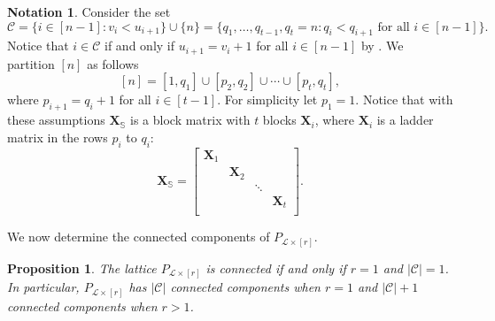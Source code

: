 \documentclass[11pt,a4paper,reqno,dvipsnames]{amsart}
\theoremstyle{plain}
\newtheorem{Proposition}[Theorem]{Proposition}
\theoremstyle{definition}
\newtheorem{Assumptions and Discussion}[Theorem]{Assumptions and Discussion}
\newtheorem{Notation}[Theorem]{Notation}
\theoremstyle{remark}
\newcommand\bfX{\mathbf{X}}
\newcommand\bfS{\mathbb{S}}
\newcommand\calC{\mathcal{C}}
\newcommand\calL{\mathcal{L}}
\newcommand{\Lr}{\ensuremath{\calL\times[r]}}
\begin{document}
\begin{Notation}\label{not: disconnected partition}
    Consider the set $$\calC=\{i\in [n-1]: v_i<u_{i+1}\} \cup \{n\}=\{q_1, \ldots, q_{t-1}, q_t=n: q_{i}<q_{i+1} \text{ for all } i\in[n-1]\}.$$ 
Notice that $i\in \calC$ if and only if $u_{i+1}=v_i+1$ for all $i\in [n-1]$ by .
    We partition $[n]$ as follows \[[n]=[1, q_{1}]\cup [p_{2}, q_2]\cup \cdots \cup[p_{t}, q_t],\] where $p_{i+1}=q_{i}+1$ for all $i\in[t-1]$. 
    For simplicity let $p_1=1$.
Notice that with these assumptions $\bfX_{\bfS}$ is a block matrix with $t$ blocks $\bfX_i$, where $\bfX_i$ is a ladder matrix in the rows $p_i$ to $q_i$:
    $$\bfX_{\bfS}=\begin{bmatrix}
        \bfX_1 &&&\\
        &\bfX_2&&\\
        &&\ddots&\\
        &&&\bfX_t\\
    \end{bmatrix}.$$
\end{Notation}


We now determine the connected components of $P_{\Lr}$.



\begin{Proposition} \label{components}
 The lattice $P_{\Lr}$ is connected if and only if $r=1$ and $|\calC|=1$.
   In particular, $P_{\Lr}$ has $|\calC|$ connected components when $r=1$ and $|\calC| +1$ connected components when $r> 1$. 
\end{Proposition}
\end{document}
